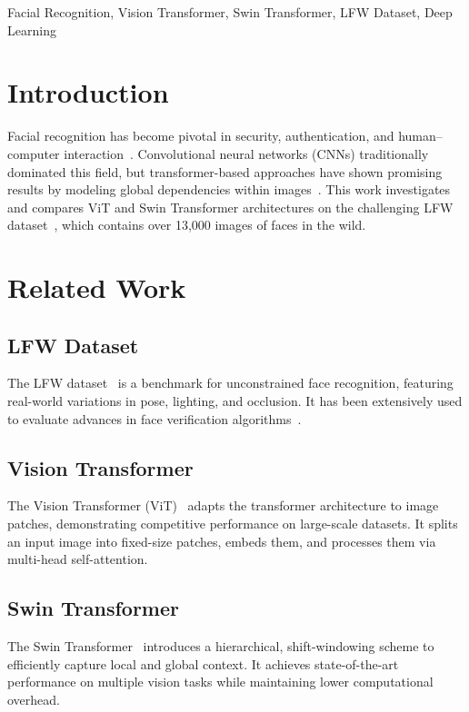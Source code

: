 \documentclass[twocolumn]{IEEEtran}
\begin{document}
\begin{IEEEkeywords}
Facial Recognition, Vision Transformer, Swin Transformer, LFW Dataset, Deep Learning
\end{IEEEkeywords}

\section{Introduction}
Facial recognition has become pivotal in security, authentication, and human–computer interaction~\cite{jain2004introduction}. Convolutional neural networks (CNNs) traditionally dominated this field, but transformer-based approaches have shown promising results by modeling global dependencies within images~\cite{dosovitskiy2020image}. This work investigates and compares ViT and Swin Transformer architectures on the challenging LFW dataset~\cite{huang2008lfw}, which contains over 13,000 images of faces in the wild.

\section{Related Work}
\subsection{LFW Dataset}
The LFW dataset~\cite{huang2008lfw} is a benchmark for unconstrained face recognition, featuring real-world variations in pose, lighting, and occlusion. It has been extensively used to evaluate advances in face verification algorithms~\cite{learned2016lfwweb}.

\subsection{Vision Transformer}
The Vision Transformer (ViT)~\cite{dosovitskiy2020image} adapts the transformer architecture to image patches, demonstrating competitive performance on large-scale datasets. It splits an input image into fixed-size patches, embeds them, and processes them via multi-head self-attention.

\subsection{Swin Transformer}
The Swin Transformer~\cite{liu2021swin} introduces a hierarchical, shift-windowing scheme to efficiently capture local and global context. It achieves state-of-the-art performance on multiple vision tasks while maintaining lower computational overhead.
\end{document}
